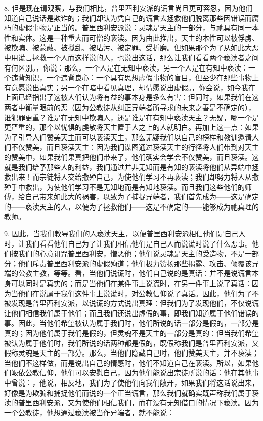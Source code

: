 8. 但是现在请观察，与我们相比，普里西利安派的谎言尚且更可容忍，因为他们知道自己说话是欺诈的；我们却认为凭自己的谎言去拯救他们脱离那些因错误而腐朽的虚假事物是正当的。普里西利安派说：灵魂是天主的一部分，与祂具有同一本性和实体。这是一种重大而可憎的亵渎。因为由此推出，天主的本性可以被俘虏、被欺骗、被蒙蔽、被搅乱、被玷污、被定罪、受折磨。但如果那个为了从如此大恶中用谎言拯救一个人而这样说的人，也说出这话，那么让我们看看两个亵渎者之间有何区别。，你说：那么，一个人是在无知中亵渎，另一个人是在有知中亵渎：一个违背知识，一个违背良心：一个具有思想虚假事物的盲目，但至少在那些事物上有意愿说出真实；另一个在暗中看见真理，却情愿说出虚假。，你会说，如今我在上面已经指出了这被人们认为将有益的事本身是多么有害：但同时，如果我们在这两者中衡量眼前的恶（因为公教徒从纠正异端者所寻求的未来之善是不确定的），谁犯罪更重？谁是在无知中欺骗人，还是谁是在有知中亵渎天主？无疑，哪一个是更严重的，那个以忧惧的虔敬将天主置于人之上的人就明白。再加上这一点：如果为了引导人们赞美天主而可以亵渎天主，那么无疑我们以自己的榜样和教训邀请人们不仅赞美，而且亵渎天主：因为我们谋图通过亵渎天主的行径将人们带到对天主的赞美中，如果我们果真把他们带来了，他们确实会学会不仅赞美，而且亵渎。这就是我们给予那些人的利益，我们通过并非无知而是有知的亵渎将他们从异端中拯救出来！而宗徒将人交给撒殚自己，为使他们学习不再亵渎；我们却努力将人从撒殚手中救出，为使他们学习不是无知地而是有知地亵渎。而且我们这些他们的师傅，给自己带来如此大的祸害，以致为了捕捉异端者，我们首先成为——这是确定的——亵渎天主的人，以便为了拯救他们——这是不确定的——能够成为祂真理的教师。\par

9. 因此，当我们教导我们的人亵渎天主，以便普里西利安派相信他们是自己人时，让我们看看他们自己为了让我们相信他们是自己人而说谎时说了什么恶事。他们按我们的心意诅咒普里西利安，憎恶他；他们说灵魂是天主的受造物，不是一部分；他们斥责普里西利安派的虚假殉道；他们极力赞扬那些揭露、攻击、倾覆该异端的公教主教，等等。看，当他们说谎时，他们自己说的是真话：并不是说谎言本身可以同时是真实的；而是当他们在某件事上说谎时，在另一件事上说了真话：因为当他们在说属于我们这件事上说谎时，对公教信仰说了真话。因此，他们为了不被发现是普里西利安派，以说谎的方式说出真理：但我们为了发现他们，不仅说谎让他们相信我们属于他们；而且我们还说出虚假的事，即我们知道属于他们错误的事。因此，当他们希望被认为属于我们时，他们所说的话一部分是假的，一部分是真的；因为他们属于我们是假的，但灵魂不是天主的一部分是真的：但当我们希望被认为属于他们时，我们所说的话两种都是假的，既假称我们是普里西利安派，又假称灵魂是天主的一部分。那么，当他们隐藏自己时，他们赞美天主，并不亵渎；当他们不这样做，而是说出自己的情感时，他们不知道自己在亵渎。所以，如果他们皈依公教信仰，他们可以安慰自己，因为他们能说出宗徒所说的话：他在其他事中曾说：，他说，相反地，我们为了使他们向我们敞开，如果我们将这话说出来，好像是为欺骗和捕捉他们而说的一个正当谎言，那么我们就确实既声称我们属于亵渎的普里西利安派，又为使他们相信我们，而在没有无知借口的情况下亵渎。因为一个公教徒，他想通过亵渎被当作异端者，就不能说：\par

